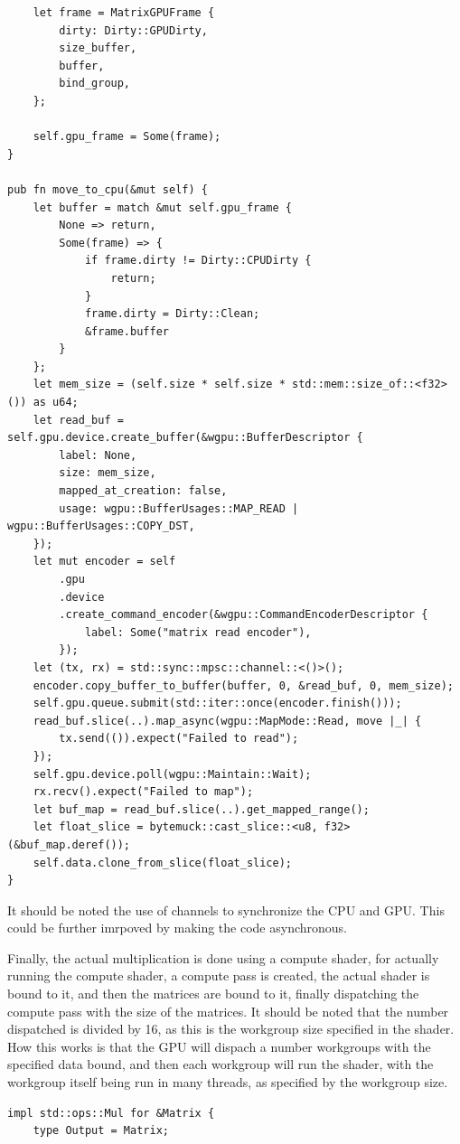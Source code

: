 \documentclass{article}
\begin{document}
\begin{appendices}
\begin{verbatim}
	let frame = MatrixGPUFrame {
		dirty: Dirty::GPUDirty,
		size_buffer,
		buffer,
		bind_group,
	};

	self.gpu_frame = Some(frame);
}

pub fn move_to_cpu(&mut self) {
	let buffer = match &mut self.gpu_frame {
		None => return,
		Some(frame) => {
			if frame.dirty != Dirty::CPUDirty {
				return;
			}
			frame.dirty = Dirty::Clean;
			&frame.buffer
		}
	};
	let mem_size = (self.size * self.size * std::mem::size_of::<f32>()) as u64;
	let read_buf = self.gpu.device.create_buffer(&wgpu::BufferDescriptor {
		label: None,
		size: mem_size,
		mapped_at_creation: false,
		usage: wgpu::BufferUsages::MAP_READ | wgpu::BufferUsages::COPY_DST,
	});
	let mut encoder = self
		.gpu
		.device
		.create_command_encoder(&wgpu::CommandEncoderDescriptor {
			label: Some("matrix read encoder"),
		});
	let (tx, rx) = std::sync::mpsc::channel::<()>();
	encoder.copy_buffer_to_buffer(buffer, 0, &read_buf, 0, mem_size);
	self.gpu.queue.submit(std::iter::once(encoder.finish()));
	read_buf.slice(..).map_async(wgpu::MapMode::Read, move |_| {
		tx.send(()).expect("Failed to read");
	});
	self.gpu.device.poll(wgpu::Maintain::Wait);
	rx.recv().expect("Failed to map");
	let buf_map = read_buf.slice(..).get_mapped_range();
	let float_slice = bytemuck::cast_slice::<u8, f32>(&buf_map.deref());
	self.data.clone_from_slice(float_slice);
}
\end{verbatim}

It should be noted the use of channels to synchronize the CPU and GPU.
This could be further imrpoved by making the code asynchronous.

Finally, the actual multiplication is done using a compute shader,
for actually running the compute shader, a compute pass is created,
the actual shader is bound to it, and then the matrices are bound to it,
finally dispatching the compute pass with the size of the matrices.
It should be noted that the number dispatched is divided by 16, as this is
the workgroup size specified in the shader.
How this works is that the GPU will dispach a number workgroups with the specified
data bound, and then each workgroup will run the shader, with the workgroup itself being run in many threads,
as specified by the workgroup size.

\begin{verbatim}
impl std::ops::Mul for &Matrix {
	type Output = Matrix;


\end{verbatim}
\end{appendices}
\end{document}
